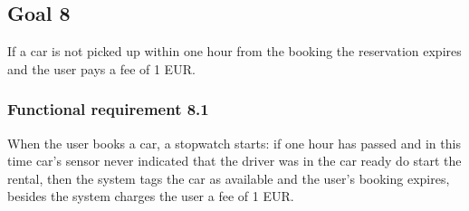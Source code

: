 \subsection{Goal 8}
If a car is not picked up within one hour from the booking the reservation expires and the user pays a fee of 1 EUR.

\setcounter{secnumdepth}{3}
\subsubsection{Functional requirement 8.1}
When the user books a car, a stopwatch starts: if one hour has passed and in this time car's sensor never indicated that the driver was in the car ready do start the rental, then the system tags the car as available and the user’s booking expires, besides the system charges the user a fee of 1 EUR.